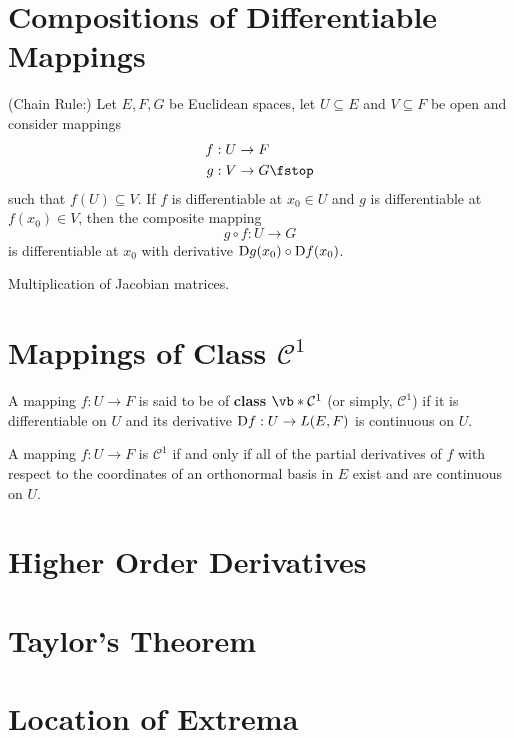 \section{Compositions of Differentiable Mappings}
\begin{theorem}
  (Chain Rule:) Let \( E, F, G \) be Euclidean spaces, let \( U\subseteq E \) and \( V\subseteq F \) be open and consider mappings
  \begin{align*}
    f&:U\to F\\
    g&:V\to G\fstop
  \end{align*}
  such that \( f(U)\subseteq V \). If \( f \) is differentiable at \( x_0\in U \) and \( g \) is differentiable at \( f(x_0)\in V \), then the composite mapping
  \[ g\circ f:U\to G \]
  is differentiable at \( x_0 \) with derivative \( \text{D} g(x_0)\circ\text{D} f(x_0) \).
\end{theorem}
 Multiplication of Jacobian matrices.
\section{Mappings of Class \( \mathcal{C}^1\)}
\begin{definition}
  A mapping \( f:U\to F \) is said to be of \textbf{class \(\vb*{\mathcal{C}^1}\)} (or simply, \( \mathcal{C}^1 \)) if it is differentiable on \( U \) and its derivative \( \text{D} f:U\to L(E,F) \) is continuous on \( U \).
\end{definition}

\begin{theorem}
  A mapping \( f:U\to F \) is \( \mathcal{C}^1 \) if and only if all of the partial derivatives of \( f \) with respect to the coordinates of an orthonormal basis in \( E \) exist and are continuous on \( U \).
\end{theorem}
\section{Higher Order Derivatives}
\section{Taylor's Theorem}
\section{Location of Extrema}

